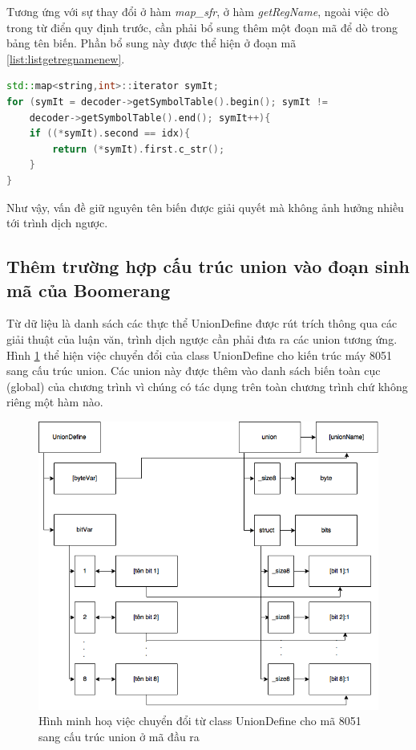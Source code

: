 Tương ứng với sự thay đổi ở hàm \textit{map\_sfr},  ở hàm \textit{getRegName}, ngoài việc dò trong từ điển quy định trước, cần phải bổ sung thêm một đoạn mã để dò trong bảng tên biến. Phần bổ sung này được thể hiện ở đoạn mã \ref{list:listgetregnamenew}.
\begin{lstlisting}[caption={Phần mã mới được bổ sung trong hàm getRegName},label={list:listgetregnamenew},language=c++]
std::map<string,int>::iterator symIt;
for (symIt = decoder->getSymbolTable().begin(); symIt != 
	decoder->getSymbolTable().end(); symIt++){
	if ((*symIt).second == idx){
		return (*symIt).first.c_str();
	}
}
\end{lstlisting}
Như vậy, vấn đề giữ nguyên tên biến được giải quyết mà không ảnh hưởng nhiều tới trình dịch ngược.

\subsection{Thêm trường hợp cấu trúc union vào đoạn sinh mã của Boomerang}

Từ dữ liệu là danh sách các thực thể UnionDefine được rút trích thông qua các giải thuật của luận văn, trình dịch ngược cần phải đưa ra các union tương ứng. Hình \ref{fig:uniondefinemapping} thể hiện việc chuyển đổi của class UnionDefine cho kiến trúc máy 8051 sang cấu trúc union. Các union này được thêm vào danh sách biến toàn cục (global) của chương trình vì chúng có tác dụng trên toàn chương trình chứ không riêng một hàm nào.

\begin{figure}[h!]
\centering
\includegraphics[width=\linewidth]{image/unionDefineMapping}
\caption{Hình minh hoạ việc chuyển đổi từ class UnionDefine cho mã 8051 sang cấu trúc union ở mã đầu ra}
\label{fig:uniondefinemapping}
\end{figure}

